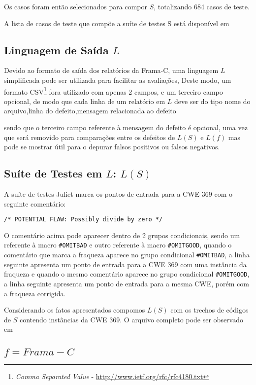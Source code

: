   Os casos foram então selecionados para compor $S$, totalizando 684 casos de teste.

  A lista de casos de teste que compõe a suíte de testes S está disponível em 

  \subsection{Linguagem de Saída $L$}

  Devido ao formato de saída dos relatórios da Frama-C, uma linguagem $L$ simplificada pode ser utilizada para facilitar as avaliações, Deste modo, um formato CSV\footnote{\textit{Comma Separated Value} - \url{http://www.ietf.org/rfc/rfc4180.txt}} fora utilizado com apenas 2 campos, e um terceiro campo opcional, de modo que cada linha de um relatório em $L$ deve ser do tipo
  nome do arquivo,linha do defeito,mensagem relacionada ao defeito

  sendo que o terceiro campo referente à mensagem do defeito é opcional, uma vez que será removido para comparações entre os defeitos de $L(S)$ e $L(f)$ mas pode se mostrar útil para o depurar falsos positivos ou falsos negativos.

  \subsection{Suíte de Testes em $L$: $L(S)$}

  A suíte de testes Juliet marca os pontos de entrada para a CWE 369 com o seguinte comentário:

  \lstinline{/* POTENTIAL FLAW: Possibly divide by zero */}

  O comentário acima pode aparecer dentro de 2 grupos condicionais, sendo um referente à macro \lstinline{#OMITBAD} e outro referente à macro \lstinline{#OMITGOOD}, quando o comentário que marca a fraqueza aparece no grupo condicional \lstinline{#OMITBAD}, a linha seguinte apresenta um ponto de entrada para a CWE 369 com uma instância da fraqueza e quando o mesmo comentário aparece no grupo condicional \lstinline{#OMITGOOD}, a linha seguinte apresenta um ponto de entrada para a mesma CWE, porém com a fraqueza corrigida.

  Considerando os fatos apresentados compomos $L(S)$ com os trechos de códigos de $S$ contendo instâncias da CWE 369. O arquivo completo pode ser observado em 

  \subsection{$f = Frama-C$}
